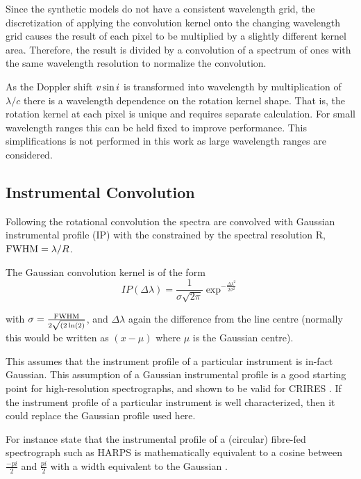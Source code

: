 Since the synthetic models do not have a consistent wavelength grid, the discretization of applying the convolution kernel onto the changing wavelength grid causes the result of each pixel to be multiplied by a slightly different kernel area.
Therefore, the result is divided by a convolution of a spectrum of ones with the same wavelength resolution to normalize the convolution.

As the Doppler shift \(v\sin{i}\) is transformed into wavelength by multiplication of $\lambda  / c$ there is a wavelength dependence on the rotation kernel shape. That is, the rotation kernel at each pixel is unique and requires separate calculation. For small wavelength ranges this can be held fixed to improve performance. This simplifications is not performed in this work as large wavelength ranges are considered. 


\subsection{Instrumental Convolution}
Following the rotational convolution the spectra are convolved with Gaussian instrumental profile ({\textrm{IP}}) with the {\fwhm}  constrained by the spectral resolution R, $\textrm{FWHM}= \lambda/R$.

The Gaussian convolution kernel is of the form
\begin{equation}
IP(\Delta\lambda) = \frac{1}{\sigma \sqrt{2\pi}} \exp^{-\frac{\Delta\lambda^2}{2 \sigma^2}}    \label{eqn:IP_profile}
\end{equation}

with $\sigma = \frac{\textrm{FWHM}} {2\sqrt{(2\ln(2)}}$, and $\Delta$$\lambda$ again the difference from the line centre (normally this would be written as $(x-\mu)$ where $\mu$ is the Gaussian centre).

This assumes that the instrument profile of a particular instrument is in-fact Gaussian. This assumption of a Gaussian instrumental profile is a good starting point for high-resolution spectrographs, and shown to be valid for CRIRES \citep{seifahrt_synthesising_2010}.
If the instrument profile of a particular instrument is well characterized, then it could replace the Gaussian profile used here.

For instance \citet{artigau_optical_2018}  state that the instrumental profile of a (circular) fibre-fed spectrograph such as {HARPS} is mathematically equivalent to a cosine between $\frac{-pi}{2}$ and $\frac{pi}{2}$ with a width equivalent to the Gaussian {\fwhm}.

